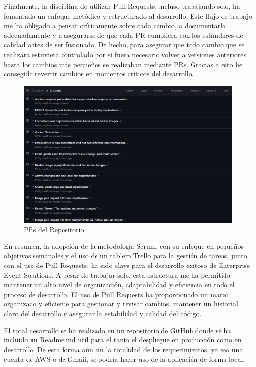 Finalmente, la disciplina de utilizar Pull Requests, incluso trabajando solo, ha fomentado un enfoque metódico y estructurado al desarrollo. Este 
flujo de trabajo me ha obligado a pensar críticamente sobre cada cambio, a documentarlo adecuadamente y a asegurarse de que cada PR cumpliera con los 
estándares de calidad antes de ser fusionado. De hecho, para asegurar que todo cambio que se realizara estuviera controlado por si fuera necesario volver a versiones anteriores
hasta los cambios más pequeños se realizaban mediante PRs. Gracias a esto he consegido revertir cambios en momentos críticos del desarrollo.
\newpage
\begin{figure}[h]
    \centering
    \includegraphics[width=\linewidth]{PRs.png}
    \caption{PRs del Repositorio.}
    \label{fig:metodologias2}
\end{figure}

En resumen, la adopción de la metodología Scrum, con su enfoque en pequeños objetivos semanales y el uso de un tablero Trello para la gestión de tareas, 
junto con el uso de Pull Requests, ha sido clave para el desarrollo exitoso de Enterprise Event Solutions. A pesar de trabajar solo, esta estructura me ha 
permitido mantener un alto nivel de organización, adaptabilidad y eficiencia en todo el proceso de desarrollo. El uso de Pull Requests ha proporcionado un 
marco organizado y eficiente para gestionar y revisar cambios, mantener un historial claro del desarrollo y asegurar la estabilidad y calidad del código.

El total desarrollo se ha realizado en un repositorio de GitHub donde se ha incluido un Readme.md utíl para el tanto el despliegue en producción como en desarrollo. De esta forma
aún sin la totalidad de los requerimientos, ya sea una cuenta de AWS o de Gmail, se podría hacer uso de la aplicación de forma local.
